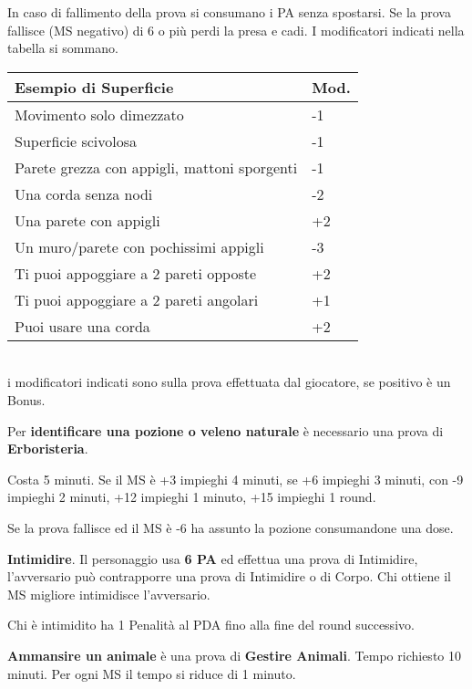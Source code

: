 \documentclass[12pt,a4paper,twoside,openany]{book}
\begin{document}
\begin{multicols}{2}
In caso di fallimento della prova si consumano i PA senza spostarsi. Se la prova fallisce (MS negativo) di 6 o più perdi la presa e cadi. I modificatori indicati nella tabella si sommano.\\

\begin{tabularx}{0.45\textwidth}{Xl}
	\textbf{Esempio di Superficie} & Mod.\\
	\toprule
	Movimento solo dimezzato & -1\\
	Superficie scivolosa&-1\\
	Parete grezza con appigli, mattoni sporgenti&-1\\
	Una corda senza nodi&-2\\
	Una parete con appigli &+2\\
	Un muro/parete con pochissimi appigli&-3\\
	Ti puoi appoggiare a 2 pareti opposte&+2\\
	Ti puoi appoggiare a 2 pareti angolari&+1\\
	Puoi usare una corda&+2\\
\end{tabularx}\\

i modificatori indicati sono sulla prova effettuata dal giocatore, se positivo è un Bonus.

\medskip

Per \textbf{identificare una pozione o veleno naturale} è necessario una prova di \textbf{Erboristeria}.

Costa 5 minuti. Se il MS è +3 impieghi 4 minuti, se +6 impieghi 3 minuti, con -9 impieghi 2 minuti, +12 impieghi 1 minuto, +15 impieghi 1 round.

Se la prova fallisce ed il MS è -6 ha assunto la pozione consumandone una dose.

\medskip

\textbf{Intimidire}. Il personaggio usa \textbf{6 PA} ed effettua una prova di Intimidire, l'avversario può contrapporre una prova di Intimidire o di Corpo. Chi ottiene il MS migliore intimidisce l'avversario.

Chi è intimidito ha 1 Penalità al PDA fino alla fine del round successivo.

\medskip

\textbf{Ammansire un animale} è una prova di \textbf{Gestire Animali}. Tempo richiesto 10 minuti. Per ogni MS il tempo si riduce di 1 minuto.


\end{multicols}
\end{document}
